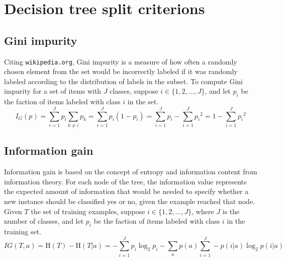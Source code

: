 \documentclass[11pt, a4paper]{article}
\begin{document}
\appendix
\section{Decision tree split criterions}
  \label{appendix:splitcriterions}
  \subsection{Gini impurity}
    Citing \texttt{wikipedia.org}, Gini impurity is a measure of how often a randomly chosen element from the set would be incorrectly labeled if it was randomly labeled according to the distribution of labels in the subset. To compute Gini impurity for a set of items with $J$ classes, suppose $i\in\{1,2,...,J\}$, and let $p_{i}$ be the faction of items labeled with class $i$ in the set.
    \[{I} _{G}(p)=\sum _{i=1}^{J}p_{i}\sum _{k\neq i}p_{k}=\sum _{i=1}^{J}p_{i}(1-p_{i})=\sum _{i=1}^{J}p_{i}-\sum _{i=1}^{J}{p_{i}}^{2}=1-\sum _{i=1}^{J}{p_{i}}^{2}\]
  \subsection{Information gain}
    Information gain is based on the concept of entropy and information content from information theory. For each node of the tree, the information value represents the expected amount of information that would be needed to specify whether a new instance should be classified yes or no, given the example reached that node. Given $T$ the set of training examples, suppose $i\in\{1,2,...,J\}$, where $J$ is the number of classes, and let $p_{i}$ be the faction of items labeled with class $i$ in the training set.
    \[IG(T, a)=\mathrm{H}(T)-\mathrm{H}(T|a)=-\sum _{i=1}^{J}p_{i}\log _{2}{p_{i}}-\sum _{a}{p(a)\sum _{i=1}^{J}-p(i|a)\log _{2}{p(i|a)}}\]
\end{document}
